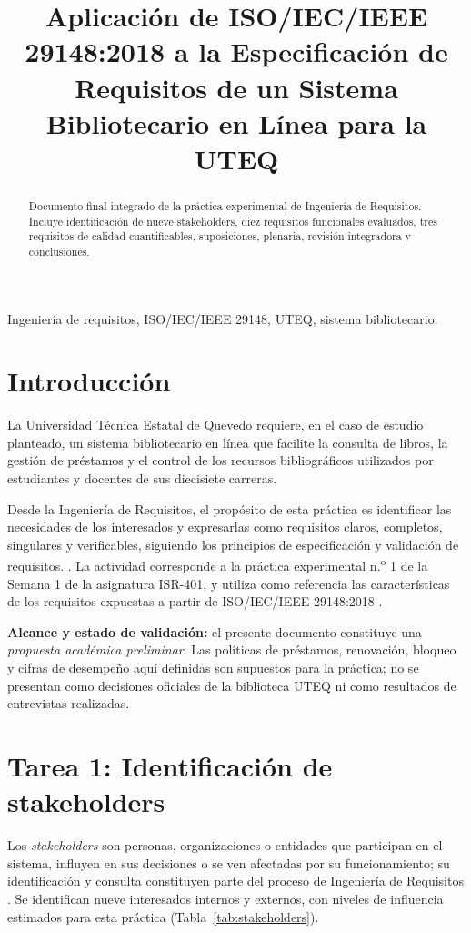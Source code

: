 \documentclass[conference,onecolumn]{IEEEtran}
\title{Aplicación de ISO/IEC/IEEE 29148:2018 a la Especificación de Requisitos de un Sistema Bibliotecario en Línea para la UTEQ}
\author{\IEEEauthorblockN{Allan, Danela, Winston, Gilces}\IEEEauthorblockA{Carrera de Ingeniería de Software\\
Facultad de Ciencias de la Computación\\
Universidad Técnica Estatal de Quevedo, Ecuador\\
Ingeniería de Requisitos -- ISR-401}}
\begin{document}
\maketitle

\begin{abstract}
Documento final integrado de la práctica experimental de Ingeniería de Requisitos. Incluye identificación de nueve stakeholders, diez requisitos funcionales evaluados, tres requisitos de calidad cuantificables, suposiciones, plenaria, revisión integradora y conclusiones.
\end{abstract}

\begin{IEEEkeywords}
Ingeniería de requisitos, ISO/IEC/IEEE 29148, UTEQ, sistema bibliotecario.
\end{IEEEkeywords}

\section{Introducción}
La Universidad Técnica Estatal de Quevedo requiere, en el caso de estudio planteado, un sistema bibliotecario en línea que facilite la consulta de libros, la gestión de préstamos y el control de los recursos bibliográficos utilizados por estudiantes y docentes de sus diecisiete carreras.

Desde la Ingeniería de Requisitos, el propósito de esta práctica es identificar las necesidades de los interesados y expresarlas como requisitos claros, completos, singulares y verificables, siguiendo los principios de especificación y validación de requisitos. \cite{ieee29148,pohl2025,swebok2024}. La actividad corresponde a la práctica experimental n.\textsuperscript{o} 1 de la Semana 1 de la asignatura ISR-401, y utiliza como referencia las características de los requisitos expuestas a partir de ISO/IEC/IEEE 29148:2018 \cite{uteqsemana1,ieee29148}.

\textbf{Alcance y estado de validación:} el presente documento constituye una \emph{propuesta académica preliminar}. Las políticas de préstamos, renovación, bloqueo y cifras de desempeño aquí definidas son supuestos para la práctica; no se presentan como decisiones oficiales de la biblioteca UTEQ ni como resultados de entrevistas realizadas.

\section{Tarea 1: Identificación de stakeholders}
Los \emph{stakeholders} son personas, organizaciones o entidades que participan en el sistema, influyen en sus decisiones o se ven afectadas por su funcionamiento; su identificación y consulta constituyen parte del proceso de Ingeniería de Requisitos \cite{ieee29148,pohl2025}. Se identifican nueve interesados internos y externos, con niveles de influencia estimados para esta práctica (Tabla~\ref{tab:stakeholders}).
\end{document}
